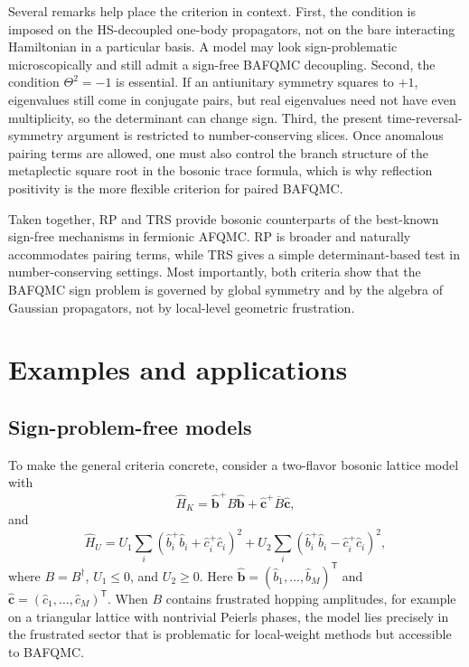 \documentclass[twocolumn,aps,prb,10pt,amsmath,amssymb,amsthm,superscriptaddress]{revtex4-2}
\newcommand{\trans}{\mathsf{T}}
\newcommand{\hc}{\dagger}
\newcommand{\bb}[1]{\bm{#1}}
\theoremstyle{remark}
\begin{document}
Several remarks help place the criterion in context. First, the condition is imposed on the HS-decoupled one-body propagators, not on the bare interacting Hamiltonian in a particular basis. A model may look sign-problematic microscopically and still admit a sign-free BAFQMC decoupling. Second, the condition $\Theta^2=-1$ is essential. If an antiunitary symmetry squares to $+1$, eigenvalues still come in conjugate pairs, but real eigenvalues need not have even multiplicity, so the determinant can change sign. Third, the present time-reversal-symmetry argument is restricted to number-conserving slices. Once anomalous pairing terms are allowed, one must also control the branch structure of the metaplectic square root in the bosonic trace formula, which is why reflection positivity is the more flexible criterion for paired BAFQMC.

Taken together, RP and TRS provide bosonic counterparts of the best-known sign-free mechanisms in fermionic AFQMC. RP is broader and naturally accommodates pairing terms, while TRS gives a simple determinant-based test in number-conserving settings. Most importantly, both criteria show that the BAFQMC sign problem is governed by global symmetry and by the algebra of Gaussian propagators, not by local-level geometric frustration.







\section{Examples and applications}
\label{sec:examples}

\subsection{Sign-problem-free models}
\label{sec:models}

To make the general criteria concrete, consider a two-flavor bosonic lattice model with
\begin{equation}
    \hat H_K = \hat{\bb b}^+ B\hat{\bb b} + \hat{\bb c}^+\overline{B}\hat{\bb c},
    \label{eq:example_HK}
\end{equation}
and
\begin{equation}
    \hat H_U = U_{1}\sum_{i}\left(\hat b_{i}^+\hat b_{i}+\hat c_{i}^+\hat c_{i}\right)^{2}+U_{2}\sum_{i}\left(\hat b_{i}^+\hat b_{i}-\hat c_{i}^+\hat c_{i}\right)^{2},
    \label{eq:example_HU}
\end{equation}
where $B=B^{\hc}$, $U_{1}\leq 0$, and $U_{2}\geq 0$. Here $\hat{\bb b}=(\hat b_1,\ldots,\hat b_M)^\trans$ and $\hat{\bb c}=(\hat c_1,\ldots,\hat c_M)^\trans$. When $B$ contains frustrated hopping amplitudes, for example on a triangular lattice with nontrivial Peierls phases, the model lies precisely in the frustrated sector that is problematic for local-weight methods but accessible to BAFQMC.
\end{document}
